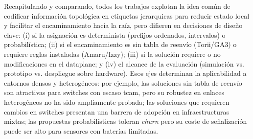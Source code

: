 Recapitulando y comparando, todos los trabajos explotan la idea común de codificar información topológica en etiquetas jerarquicas para reducir estado local y facilitar el encaminamiento hacia la raíz, pero difieren en decisiones de diseño clave: (i) si la asignación es determinista (prefijos ordenados, intervalos) o probabilística; (ii) si el encaminamiento es sin tabla de reenvío (Torii/GA3) o requiere reglas instaladas (Amaru/Izzy); (iii) si la solución requiere o no modificaciones en el dataplane; y (iv) el alcance de la evaluación (simulación vs. prototipo vs. despliegue sobre hardware). Esos ejes determinan la aplicabilidad a entornos densos y heterogéneos: por ejemplo, las soluciones sin tabla de reenvío son atractivas para switches con escaso \gls{tcam}, pero su robustez en enlaces heterogéneos no ha sido ampliamente probada; las soluciones que requieren cambios en switches presentan una barrera de adopción en infraestructuras mixtas; las propuestas probabilísticas toleran \textit{churn} pero su coste de señalización puede ser alto para sensores con baterías limitadas.

